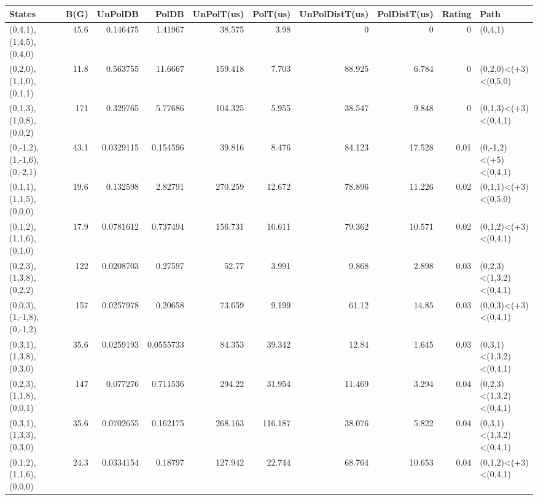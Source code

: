 \begin{tabular}{lrrrrrrrrl}
\hline
 States                     &   B(G) &   UnPolDB &      PolDB &   UnPolT(us) &   PolT(us) &   UnPolDistT(us) &   PolDistT(us) &   Rating & Path                    \\
\hline
 (0,4,1),(1,4,5),(0,4,0)    &   45.6 & 0.146475  &  1.41967   &       38.575 &      3.98  &            0     &          0     &     0    & (0,4,1)                 \\
 (0,2,0),(1,1,0),(0,1,1)    &   11.8 & 0.563755  & 11.6667    &      159.418 &      7.703 &           88.925 &          6.784 &     0    & (0,2,0)<(+3)<(0,5,0)    \\
 (0,1,3),(1,0,8),(0,0,2)    &  171   & 0.329765  &  5.77686   &      104.325 &      5.955 &           38.547 &          9.848 &     0    & (0,1,3)<(+3)<(0,4,1)    \\
 (0,-1,2),(1,-1,6),(0,-2,1) &   43.1 & 0.0329115 &  0.154596  &       39.816 &      8.476 &           84.123 &         17.528 &     0.01 & (0,-1,2)<(+5)<(0,4,1)   \\
 (0,1,1),(1,1,5),(0,0,0)    &   19.6 & 0.132598  &  2.82791   &      270.259 &     12.672 &           78.896 &         11.226 &     0.02 & (0,1,1)<(+3)<(0,5,0)    \\
 (0,1,2),(1,1,6),(0,1,0)    &   17.9 & 0.0781612 &  0.737494  &      156.731 &     16.611 &           79.362 &         10.571 &     0.02 & (0,1,2)<(+3)<(0,4,1)    \\
 (0,2,3),(1,3,8),(0,2,2)    &  122   & 0.0208703 &  0.27597   &       52.77  &      3.991 &            9.868 &          2.898 &     0.03 & (0,2,3)<(1,3,2)<(0,4,1) \\
 (0,0,3),(1,-1,8),(0,-1,2)  &  157   & 0.0257978 &  0.20658   &       73.659 &      9.199 &           61.12  &         14.85  &     0.03 & (0,0,3)<(+3)<(0,4,1)    \\
 (0,3,1),(1,3,8),(0,3,0)    &   35.6 & 0.0259193 &  0.0555733 &       84.353 &     39.342 &           12.84  &          1.645 &     0.03 & (0,3,1)<(1,3,2)<(0,4,1) \\
 (0,2,3),(1,1,8),(0,0,1)    &  147   & 0.077276  &  0.711536  &      294.22  &     31.954 &           11.469 &          3.294 &     0.04 & (0,2,3)<(1,3,2)<(0,4,1) \\
 (0,3,1),(1,3,3),(0,3,0)    &   35.6 & 0.0702655 &  0.162175  &      268.163 &    116.187 &           38.076 &          5.822 &     0.04 & (0,3,1)<(1,3,2)<(0,4,1) \\
 (0,1,2),(1,1,6),(0,0,0)    &   24.3 & 0.0334154 &  0.18797   &      127.942 &     22.744 &           68.764 &         10.653 &     0.04 & (0,1,2)<(+3)<(0,4,1)    \\
\hline
\end{tabular}